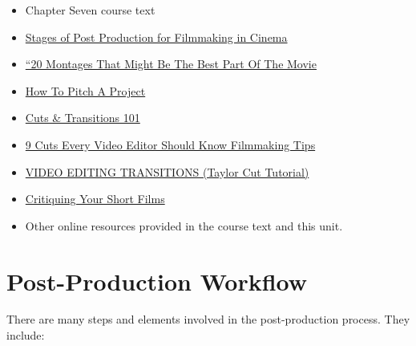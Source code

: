 \documentclass[
]{book}
\providecommand{\tightlist}{%
  \setlength{\itemsep}{0pt}\setlength{\parskip}{0pt}}
\begin{document}
\begin{itemize}
\tightlist
\item
  Chapter Seven course text\\
\item
  \href{https://www.youtube.com/watch?v=IFjyVW21Vpw}{Stages of Post Production for Filmmaking in Cinema}\\
\item
  \href{https://www.refinery29.com/en-us/best-movie-montages}{``20 Montages That Might Be The Best Part Of The Movie}\\
\item
  \href{https://www.youtube.com/watch?v=dak2DkfDTuU}{How To Pitch A Project}\\
\item
  \href{https://www.youtube.com/watch?v=OAH0MoAv2CI\&t=31s}{Cuts \& Transitions 101}\\
\item
  \href{https://www.youtube.com/watch?v=Wv3Hmf2Dxlo}{9 Cuts Every Video Editor Should Know \textbar{} Filmmaking Tips}\\
\item
  \href{https://www.youtube.com/watch?v=bdpbYeoZKnk}{VIDEO EDITING TRANSITIONS (Taylor Cut Tutorial)}\\
\item
  \href{https://www.youtube.com/watch?v=x5ASDkOSIBE}{Critiquing Your Short Films}\\
\item
  Other online resources provided in the course text and this unit.
\end{itemize}

\hypertarget{post-production-workflow}{%
\section{Post-Production Workflow}\label{post-production-workflow}}

There are many steps and elements involved in the post-production process. They include:
\end{document}
